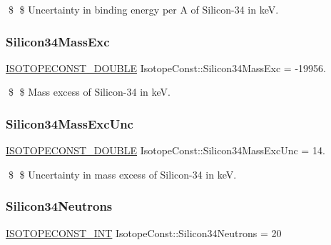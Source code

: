 \$ \$ Uncertainty in binding energy per A of Silicon-\/34 in keV. \mbox{\label{group___isotope_const-_silicon-_si34_ga9ef3fdd6d11e0f8cef8f353fb173c4d9}} 
\subsubsection{\texorpdfstring{Silicon34\+Mass\+Exc}{Silicon34MassExc}}
{\footnotesize\ttfamily \mbox{\hyperlink{group___isotope_const-_macros_ga8f45a7272ce02c0b4c65c44636ed719a}{I\+S\+O\+T\+O\+P\+E\+C\+O\+N\+S\+T\+\_\+\+D\+O\+U\+B\+LE}} Isotope\+Const\+::\+Silicon34\+Mass\+Exc = -\/19956.}

\$ \$ Mass excess of Silicon-\/34 in keV. \mbox{\label{group___isotope_const-_silicon-_si34_gaeb0502ed78b029a79ab0e73f0ef0b07e}} 
\subsubsection{\texorpdfstring{Silicon34\+Mass\+Exc\+Unc}{Silicon34MassExcUnc}}
{\footnotesize\ttfamily \mbox{\hyperlink{group___isotope_const-_macros_ga8f45a7272ce02c0b4c65c44636ed719a}{I\+S\+O\+T\+O\+P\+E\+C\+O\+N\+S\+T\+\_\+\+D\+O\+U\+B\+LE}} Isotope\+Const\+::\+Silicon34\+Mass\+Exc\+Unc = 14.}

\$ \$ Uncertainty in mass excess of Silicon-\/34 in keV. \mbox{\label{group___isotope_const-_silicon-_si34_ga1384ef107c397893aadfb8d3172bbf50}} 
\subsubsection{\texorpdfstring{Silicon34\+Neutrons}{Silicon34Neutrons}}
{\footnotesize\ttfamily \mbox{\hyperlink{group___isotope_const-_macros_ga5f18360b3e99483a35c32d789e62621c}{I\+S\+O\+T\+O\+P\+E\+C\+O\+N\+S\+T\+\_\+\+I\+NT}} Isotope\+Const\+::\+Silicon34\+Neutrons = 20}

